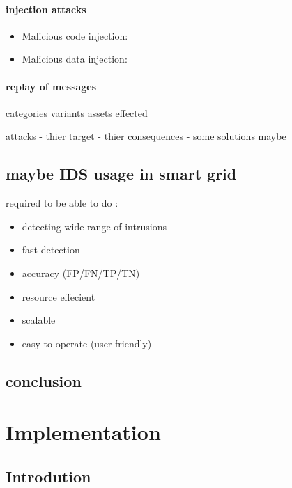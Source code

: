 \subsubsection{injection attacks}
\begin{itemize}
	\item Malicious code injection:
	\item Malicious data injection:
\end{itemize}

\subsubsection{replay of messages}


categories
	variants
	assets effected

attacks - thier target - thier consequences - some solutions maybe




\section{maybe IDS usage in smart grid}
required to be able to do :

\firmlist
\begin{itemize}
	\item detecting wide range of intrusions
	\item fast detection
	\item accuracy (FP/FN/TP/TN)
	\item resource effecient
	\item scalable
	\item easy to operate (user friendly)
\end{itemize}




\section{conclusion}













\chapter{Implementation} \label{chap:Implementation}
\section{Introdution}



